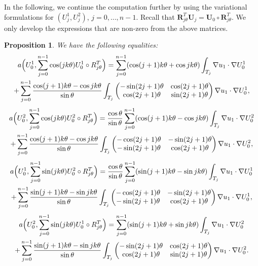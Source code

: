 \documentclass[JEP,XML,SOM,Unicode,ThmDefs,NoFloatCountersInSection,published]{cedram}
\theoremstyle{plain}
\newtheorem{propo}[thm]{Proposition}
\theoremstyle{definition}
\newcommand{\bo}[1]{{\boldsymbol#1}}
\begin{document}
In the following, we continue the computation further by using the variational formulations for $(U_j^1,U_j^2)$, $j = 0,\dots,n-1$. Recall that $\bo R_{j\theta}^T \bo U_j = \bo U_0 \circ \bo R_{j\theta}^T$. We only develop the expressions that are non-zero from the above matrices.

\begin{propo}\label{prop:detailed-computations}
We have the following equalities:
\vspace*{-5pt}
\begin{multline*}
a\Bigl(U_0^1,\sum_{j=0}^{n-1} \cos(jk\theta) U_0^1 \circ R_{j\theta}^T\Bigr)
= \sum_{j=0}^{n-1} (\cos (j+1)k\theta+\cos jk\theta) \int_{T_j}\nabla u_1 \cdot \nabla U_0^1\\
+ \sum_{j=0}^{n-1} \frac{\cos(j+1)k\theta-\cos jk\theta}{\sin \theta} \int_{T_j}\begin{pmatrix}
-\sin (2j+1)\theta & \cos (2j+1) \theta \\
\cos(2j+1)\theta & \sin (2j+1)\theta
\end{pmatrix}\nabla u_1 \cdot \nabla U_0^1,
\end{multline*}
\vspace*{-5pt}
\begin{multline*}
a\Bigl(U_0^2,\sum_{j=0}^{n-1} \cos(jk\theta) U_0^2 \circ R_{j\theta}^T\Bigr)
=\frac{\cos \theta}{\sin \theta}\sum_{j=0}^{n-1} (\cos(j+1)k\theta-\cos jk\theta) \int_{T_j} \nabla u_1 \cdot \nabla U_0^2\\
+ \sum_{j=0}^{n-1} \frac{\cos(j+1)k\theta-\cos jk\theta}{\sin \theta} \int_{T_j}
\begin{pmatrix}
-\cos(2j+1)\theta & -\sin(2j+1)\theta \\
-\sin(2j+1)\theta & \cos(2j+1)\theta
\end{pmatrix}\nabla u_1 \cdot \nabla U_0^2,
\end{multline*}
\begin{multline*}
a\Bigl(U_0^1,\sum_{j=0}^{n-1} \sin(jk\theta) U_0^2 \circ R_{j\theta}^T\Bigr)
= \frac{\cos \theta}{\sin \theta}\sum_{j=0}^{n-1} (\sin(j+1)k\theta-\sin jk\theta) \int_{T_j} \nabla u_1\cdot \nabla U_0^1\\
+ \sum_{j=0}^{n-1}\dfrac{\sin(j+1)k\theta-\sin jk\theta}{\sin \theta} \int _{T_j} \begin{pmatrix}
-\cos (2j+1)\theta & -\sin (2j+1) \theta \\
-\sin (2j+1)\theta & \cos (2j+1)\theta
\end{pmatrix}\nabla u_1 \cdot \nabla U_0^1,
\end{multline*}
\begin{multline*}
a\Bigl(U_0^2,\sum_{j=0}^{n-1} \sin(jk\theta) U_0^1 \circ R_{j\theta}^T\Bigr) = \sum_{j=0}^{n-1}(\sin (j+1)k\theta + \sin jk\theta) \int_{T_j} \nabla u_1 \cdot \nabla U_0^2 \\
+ \sum_{j=0}^{n-1}\dfrac{\sin(j+1)k\theta-\sin jk\theta}{\sin \theta} \int _{T_j} \begin{pmatrix}
-\sin (2j+1)\theta & \cos (2j+1) \theta \\
\cos (2j+1)\theta & \sin (2j+1)\theta
\end{pmatrix}\nabla u_1 \cdot \nabla U_0^2.
\end{multline*}
\end{propo}
\end{document}
